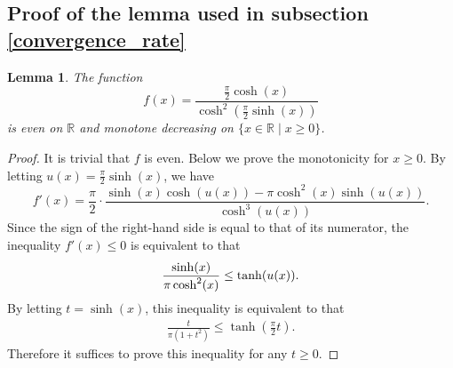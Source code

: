 \documentclass[pdflatex,sn-mathphys-num]{sn-jnl}%
\theoremstyle{thmstyleone}%
\theoremstyle{thmstyletwo}%
\newtheorem{lemma}{Lemma}%
\theoremstyle{thmstylethree}%
\begin{document}
\begin{appendices}
\section{Proof of the lemma used in subsection \ref{convergence_rate}}

\begin{lemma}
\label{Lem_diff_DE_monotone}
The function 
\[
f(x) =
\frac{\frac{\pi}{2}\cosh(x)}{\cosh^2\left(\frac{\pi}{2}\sinh(x)\right)}
\]
is even on $\mathbb{R}$ and monotone decreasing on $\{ x \in \mathbb{R} \mid  x \geq 0\}$. 
\end{lemma}

\begin{proof}
It is trivial that $f$ is even. 
Below we prove the monotonicity for $x \geq 0$. 
By letting $u(x) = \frac{\pi}{2} \sinh(x)$, we have
\[
f'(x) = 
\frac{\pi}{2} \cdot
\frac{\sinh(x) \cosh(u(x)) - \pi \cosh^{2}(x) \sinh(u(x))}{\cosh^{3}(u(x))}.
\]
Since the sign of the right-hand side is equal to that of its numerator, 
the inequality $f'(x) \leq 0$ is equivalent to that 
\begin{align}
\frac{\sinh(x)}{\pi \cosh^{2}(x)} \leq \tanh(u(x)). 
\notag
\end{align}
By letting $t = \sinh(x)$,
this inequality is equivalent to that
\begin{align}
\frac{t}{\pi (1+t^{2})} \leq \tanh \left( \frac{\pi}{2} t \right). 
\label{eq:ineq_equiv_concl}
\end{align}
Therefore it suffices to prove this inequality for any $t \geq 0$.


\end{proof}
\end{appendices}
\end{document}
